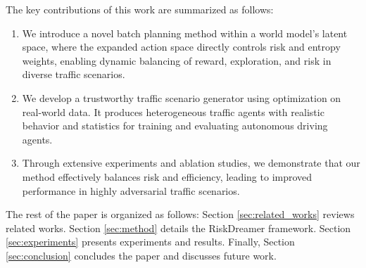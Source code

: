 The key contributions of this work are summarized as follows:

\begin{enumerate}
    \item We introduce a novel batch planning method within a world model's latent space, where the expanded action space directly controls risk and entropy weights, enabling dynamic balancing of reward, exploration, and risk in diverse traffic scenarios.

    \item We develop a trustworthy traffic scenario generator using optimization on real-world data. It produces heterogeneous traffic agents with realistic behavior and statistics for training and evaluating autonomous driving agents.

    \item Through extensive experiments and ablation studies, we demonstrate that our method effectively balances risk and efficiency, leading to improved performance in highly adversarial traffic scenarios.
\end{enumerate}

The rest of the paper is organized as follows: Section \ref{sec:related_works} reviews related works. Section \ref{sec:method} details the RiskDreamer framework. Section \ref{sec:experiments} presents experiments and  results. Finally, Section \ref{sec:conclusion} concludes the paper and discusses future work.